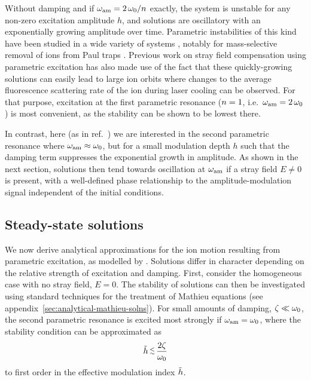 \documentclass[pra,twocolumn]{revtex4-2}
\begin{document}
Without damping and if $\omega_{\textrm{am}} = 2\, \omega_{\textrm{0}} / n$ exactly, the system is unstable for any non-zero excitation amplitude $h$, and solutions are oscillatory with an exponentially growing amplitude over time.
Parametric instabilities of this kind have been studied in a wide variety of systems \cite{rajasekarParametricResonance2016}, notably for mass-selective removal of ions from Paul traps \cite{schmidtMassselectiveRemovalIons2020}.
Previous work on stray field compensation using parametric excitation \cite{ibarakiDetectionParametricResonance2011,narayananElectricFieldCompensation2011,tanakaMicromotionCompensationSurface2012} has also made use of the fact that these quickly-growing solutions can easily lead to large ion orbits where changes to the average fluorescence scattering rate of the ion during laser cooling can be observed.
For that purpose, excitation at the first parametric resonance ($n = 1$, i.e.~$\omega_{\textrm{am}} = 2 \, \omega_{\textrm{0}}$) is most convenient, as the stability can be shown to be lowest there.

In contrast, here (as in ref.~\cite{amiram.eltonySensitive3DMicromotion2013}) we are interested in the second parametric resonance where $\omega_{\textrm{am}} \approx \omega_{\textrm{0}}$, but for a small modulation depth $h$ such that the damping term suppresses the exponential growth in amplitude.
As shown in the next section, solutions then tend towards oscillation at $\omega_{\textrm{am}}$ if a stray field $E \neq 0$ is present, with a well-defined phase relationship to the amplitude-modulation signal independent of the initial conditions.


\subsection{Steady-state solutions}
\label{sec:steady-state-soln}

We now derive analytical approximations for the ion motion resulting from parametric excitation, as modelled by .
Solutions differ in character depending on the relative strength of excitation and damping.
First, consider the homogeneous case with no stray field, ${E = 0}$.
The stability of solutions can then be investigated using standard techniques for the treatment of Mathieu equations (see appendix~\ref{sec:analytical-mathieu-solns}).
For small amounts of damping, $\zeta \ll \omega_{\textrm{0}}$, the second parametric resonance is excited most strongly if $\omega_{\textrm{am}} = \omega_{\textrm{0}}$, where the stability condition can be approximated as
\begin{equation}
	\hred \ltish \frac{2 \zeta}{\wm}
\end{equation}
to first order in the effective modulation index $\tilde{h}$.
\end{document}
